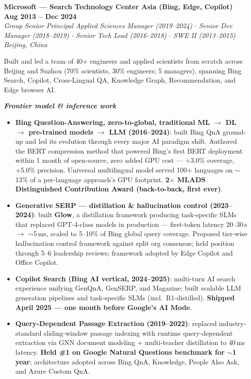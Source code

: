 \documentclass[10.5pt,letterpaper]{article}
\newcommand{\role}[4]{%
  \noindent\textbf{#1} \hfill \textbf{#3}\\
  \textit{#2} \hfill \textit{#4}\par\vspace{2pt}}
\newcommand{\expgroup}[1]{\smallskip\noindent\textbf{\textit{#1}}\par\vspace{1pt}}
\begin{document}
\vspace{4pt}
\role{Microsoft --- Search Technology Center Asia (Bing, Edge, Copilot)}{Group Senior Principal Applied Sciences Manager (2019--2024) $\cdot$ Senior Dev Manager (2018--2019) $\cdot$ Senior Tech Lead (2016--2018) $\cdot$ SWE II (2013--2015)}{Aug 2013 -- Dec 2024}{Beijing, China}
Built and led a team of 40+ engineers and applied scientists from scratch across Beijing and Suzhou (70\% scientists, 30\% engineers; 5 managers), spanning Bing Search, Copilot, Cross-Lingual QA, Knowledge Graph, Recommendation, and Edge browser AI.

\expgroup{Frontier model \& inference work}
\begin{itemize}
  \item \textbf{Bing Question-Answering, zero-to-global, traditional ML $\to$ DL $\to$ pre-trained models $\to$ LLM (2016--2024)}: built Bing QnA ground-up and led its evolution through every major AI paradigm shift. Authored the BERT compression method that powered Bing's first BERT deployment within 1 month of open-source, zero added GPU cost --- +3.0\% coverage, +5.0\% precision. Universal multilingual model served 100+ languages on $\sim$13\% of a per-language approach's GPU footprint. \textbf{2$\times$ MLADS Distinguished Contribution Award (back-to-back, first ever)}.
  \item \textbf{Generative SERP --- distillation \& hallucination control (2023--2024)}: built \textbf{Glow}, a distillation framework producing task-specific SLMs that replaced GPT-4-class models in production --- first-token latency 20--30\,s $\to$ $\sim$5\,ms, scaled to 5--10\% of Bing global query coverage. Proposed tier-wise hallucination control framework against split org consensus; held position through 5--6 leadership reviews; framework adopted by Edge Copilot and Office Copilot.
  \item \textbf{Copilot Search (Bing AI vertical, 2024--2025)}: multi-turn AI search experience unifying GenQnA, GenSERP, and Magazine; built scalable LLM generation pipelines and task-specific SLMs (incl.\ R1-distilled). \textbf{Shipped April 2025 --- one month before Google's AI Mode}.
  \item \textbf{Query-Dependent Passage Extraction (2019--2022)}: replaced industry-standard sliding-window passage indexing with runtime query-dependent extraction via GNN document modeling + multi-teacher distillation to 40\,ms latency. \textbf{Held \#1 on Google Natural Questions benchmark for $\sim$1 year}; architecture adopted across Bing QnA, Knowledge, People Also Ask, and Azure Custom QnA.
\end{itemize}
\end{document}
